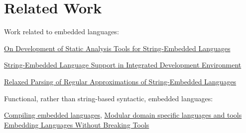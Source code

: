 \section{Related Work}
\label{sec:rel}


Work related to embedded languages:

\href{https://dl.acm.org/doi/pdf/10.1145/2855667.2855672?casa_token=erRwxy24RiYAAAAA:IPNd7QcsHKt-yA2yMALounX32-OLWC8ocOKdquHcb1gQx0C5S76G0mEBU7Vky2m1KHLf9u9tOG0vig}{On Development of Static Analysis Tools for String-Embedded Languages}

\href{https://dl.acm.org/doi/pdf/10.1145/2687233.2687247?casa_token=pTKni3IkgdcAAAAA:ODg5tbpzZVuzrV0Hu61-wXaCzxpoCMV7eFPTnDRJ3IyRxVz7vVydjgfWHx06N0EVoLnba2C4jkQCBQ}{String-Embedded Language Support in Integrated Development Environment}

\href{https://www.researchgate.net/profile/Semyon-Grigorev/publication/304480369_Relaxed_Parsing_of_Regular_Approximations_of_String-Embedded_Languages/links/5c74f641299bf1268d25c111/Relaxed-Parsing-of-Regular-Approximations-of-String-Embedded-Languages.pdf}{Relaxed Parsing of Regular Approximations of String-Embedded Languages}



Functional, rather than string-based syntactic, embedded languages:

\href{https://www.cambridge.org/core/services/aop-cambridge-core/content/view/4B0A7526CC16907F445CCF27277E9B9B/S0956796802004574a.pdf/div-class-title-compiling-embedded-languages-div.pdf}{Compiling embedded languages},
\href{https://ieeexplore.ieee.org/document/685738}{Modular domain specific languages and tools}
\href{https://scg.unibe.ch/archive/papers/Reng10aEmbeddingLanguages.pdf}{Embedding Languages Without Breaking Tools}

